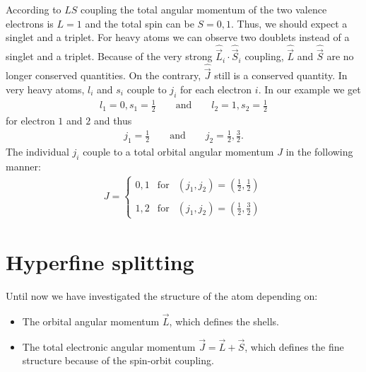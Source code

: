 \documentclass[10pt]{article}
\begin{document}
According to $LS$ coupling the total angular momentum of the two valence electrons is $L=1$ and the total spin can be $S=0,1$. Thus, we should expect a singlet and a triplet. For heavy atoms we can observe two doublets instead of a singlet and a triplet. Because of the very strong $\hat{\vec{L}}_i \cdot \hat{\vec{S}}_i$ coupling, $\hat{\vec{L}}$ and $\hat{\vec{S}}$ are no longer conserved quantities. On the contrary, $\hat{\vec{J}}$ still is a conserved quantity. In very heavy atoms, $l_i$ and $s_i$ couple to $j_i$ for each electron $i$.
%
In our example we get
\begin{align*}
l_1=0, s_1=\frac{1}{2} \qquad \text{and} \qquad l_2=1, s_2=\frac{1}{2}
\end{align*}
for electron $1$ and $2$ and thus
\begin{align*}
j_1=\frac{1}{2} \qquad \text{and}\qquad j_2=\frac{1}{2},\frac{3}{2}.
\end{align*}
The individual $j_i$ couple to a total orbital angular momentum $J$ in the following manner:
\begin{align*}
J= \left\{ \begin{array}{ccc}0,1 & \text{for} & (j_1,j_2)=\left(\frac{1}{2},\frac{1}{2}\right)\\ && \\ 1,2 & \text{for} &(j_1,j_2) = \left(\frac{1}{2}, \frac{3}{2}\right) \end{array} \right.
\end{align*}

\section{Hyperfine splitting}

Until now we have investigated the structure of the atom depending on:
\begin{itemize}
\item The orbital angular momentum $\vec{L}$, which defines the shells.
\item The total electronic angular momentum $\vec{J} = \vec{L} + \vec{S}$, which defines the fine structure because of the spin-orbit coupling.
\end{itemize}
\end{document}
